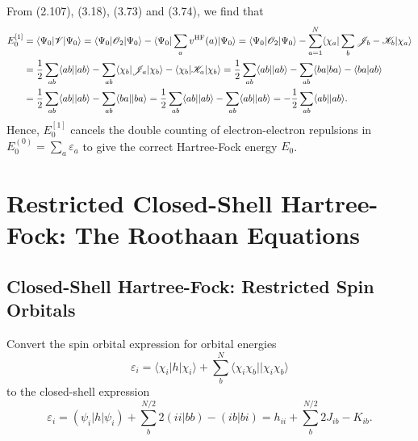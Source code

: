 \documentclass[a4paper]{book}
\newcounter{exercise}[chapter]
\newcounter{solution}[chapter]
\newcommand{\HF}{{\rm HF}}
\begin{document}
	\begin{solution}
	
	From (2.107), (3.18), (3.73) and (3.74), we find that
	\begin{align*}
		E^{[1]}_0 &= \langle \Psi_0 | \mathscr{V} | \Psi_0 \rangle = \langle \Psi_0 | \mathscr{O}_2 | \Psi_0 \rangle - \langle \Psi_0 | \sum_a v^{\HF}(a) | \Psi_0 \rangle = \langle \Psi_0 | \mathscr{O}_2 | \Psi_0 \rangle - \sum_{ a=1 }^N \langle \chi_a |  \sum_b \mathscr{J}_b - \mathscr{K}_b | \chi_a \rangle \\
		&= \frac{1}{2} \sum_{ab} \langle ab || ab \rangle - \sum_{ab} \langle \chi_b | \mathscr{J}_a  | \chi_b \rangle - \langle \chi_b | \mathscr{K}_a  | \chi_b \rangle = \frac{1}{2} \sum_{ab} \langle ab || ab \rangle - \sum_{ab} \langle ba | ba \rangle - \langle ba | ab \rangle \\
		&= \frac{1}{2} \sum_{ab} \langle ab || ab \rangle - \sum_{ab} \langle ba || ba \rangle = \frac{1}{2} \sum_{ab} \langle ab || ab \rangle - \sum_{ab} \langle ab || ab \rangle = - \frac{1}{2} \sum_{ab} \langle ab || ab \rangle.
	\end{align*}
	Hence, $E^{[1]}_0$ cancels the double counting of electron-electron repulsions in $E^{(0)}_0=\sum_a \varepsilon_a$ to give the correct Hartree-Fock energy $E_0$.
	
	\end{solution}
	
	\section{Restricted Closed-Shell Hartree-Fock: The Roothaan Equations}
	
	\subsection{Closed-Shell Hartree-Fock: Restricted Spin Orbitals}

	\begin{exercise}
	Convert the spin orbital expression for orbital energies
	\[
		\varepsilon_i = \langle \chi_i | h | \chi_i \rangle + \sum_{b}^N \langle \chi_i \chi_b || \chi_i \chi_b \rangle
	\]
	to the closed-shell expression
	\begin{equation}
		\varepsilon_i = ( \psi_i | h | \psi_i ) + \sum_{b}^{N/2} 2(ii|bb) - (ib|bi) = h_{ii} + \sum_b^{N/2} 2J_{ib} - K_{ib}. \tag{3.128}
	\end{equation}
	\end{exercise}
	
\end{document}

